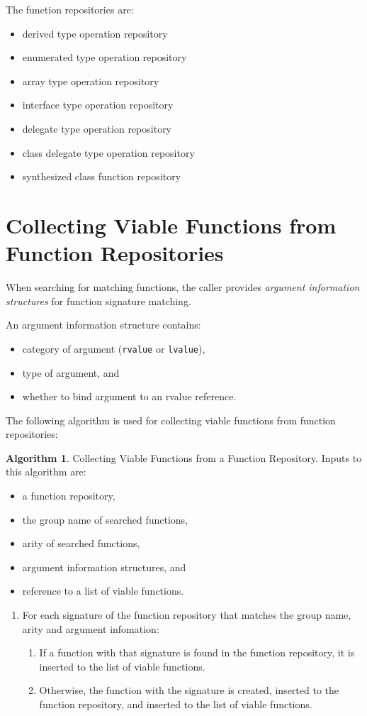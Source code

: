 \documentclass[a4paper,oneside,11pt]{book}
\theoremstyle{definition}
\newtheorem{algo}{Algorithm}[section]
\begin{document}
The function repositories are:

\begin{itemize}
\item
derived type operation repository
\item
enumerated type operation repository
\item
array type operation repository
\item
interface type operation repository
\item
delegate type operation repository
\item
class delegate type operation repository
\item
synthesized class function repository
\end{itemize}

\section{Collecting Viable Functions from Function Repositories}\label{arginfo}

When searching for matching functions, the caller provides \emph{argument information structures} for function signature matching.

An argument information structure contains:
\begin{itemize}
\item
category of argument (\verb|rvalue| or \verb|lvalue|),
\item
type of argument, and
\item
whether to bind argument to an rvalue reference.
\end{itemize}

The following algorithm is used for collecting viable functions from function repositories:

\begin{algo} Collecting Viable Functions from a Function Repository.
Inputs to this algorithm are:
\begin{itemize}
\item
a function repository,
\item
the group name of searched functions,
\item
arity of searched functions,
\item
argument information structures, and
\item
reference to a list of viable functions.
\end{itemize}
\begin{enumerate}
\item
For each signature of the function repository that matches the group name, arity and argument infomation:
\begin{enumerate}
\item
If a function with that signature is found in the function repository, it is inserted to the list of viable functions.
\item
Otherwise, the function with the signature is created, inserted to the function repository, and inserted to the list of viable functions.
\end{enumerate}
\end{enumerate}
\end{algo}
\end{document}
